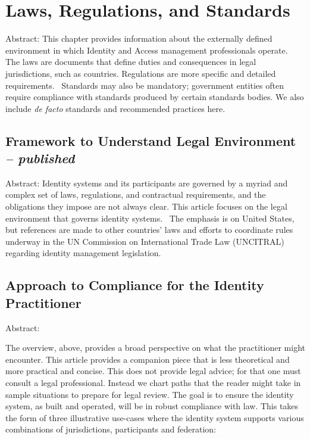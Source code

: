 \hypertarget{laws-regulations-and-standards}{%
\chapter{Laws, Regulations, and
Standards}\label{laws-regulations-and-standards}}

Abstract: This chapter provides information about the externally defined
environment in which Identity and Access management professionals
operate.~ The laws are documents that define duties and consequences in
legal jurisdictions, such as countries. Regulations are more specific
and detailed requirements.~ Standards may also be mandatory; government
entities often require compliance with standards produced by certain
standards bodies. We also include \emph{de facto} standards and
recommended practices here.

\hypertarget{framework-to-understand-legal-environment-published}{%
\section{\texorpdfstring{Framework to Understand Legal Environment
\emph{--
published}}{Framework to Understand Legal Environment -- published}}\label{framework-to-understand-legal-environment-published}}

Abstract: Identity systems and its participants are governed by a myriad
and complex set of laws, regulations, and contractual requirements, and
the obligations they impose are not always clear. This article focuses
on the legal environment that governs identity systems.~ The emphasis is
on United States, but references are made to other countries' laws and
efforts to coordinate rules underway in the UN Commission on
International Trade Law (UNCITRAL) regarding identity management
legislation.

\hypertarget{approach-to-compliance-for-the-identity-practitioner}{%
\section{Approach to Compliance for the Identity
Practitioner}\label{approach-to-compliance-for-the-identity-practitioner}}

Abstract:

The overview, above, provides a broad perspective on what the
practitioner might encounter. This article provides a companion piece
that is less theoretical and more practical and concise. This does not
provide legal advice; for that one must consult a legal professional.
Instead we chart paths that the reader might take in sample situations
to prepare for legal review. The goal is to ensure the identity system,
as built and operated, will be in robust compliance with law. This takes
the form of three illustrative use-cases where the identity system
supports various combinations of jurisdictions, participants and
federation:

